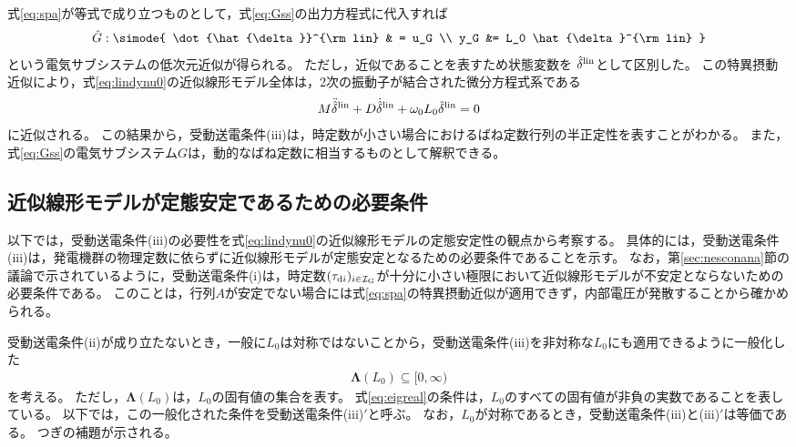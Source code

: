 \documentclass[tombow,dvipdfmx]{corona-a5-1.1}
\begin{document}
式\ref{eq:spa}が等式で成り立つものとして，式\ref{eq:Gss}の出力方程式に代入すれば
\begin{align}\label{eq:Gsssp}
\hat{G}: \simode{
\dot{\hat{\delta}}^{\rm lin} & = u_G \\
y_G &= L_0 \hat{\delta}^{\rm lin}
}
\end{align}
という電気サブシステムの低次元近似が得られる。
ただし，近似であることを表すため状態変数を
$\hat{\delta}^{\rm lin}$として区別した。
この特異摂動近似により，式\ref{eq:lindynu0}の近似線形モデル全体は，2次の振動子が結合された微分方程式系である
\begin{align}\label{eq:spamodel}
M \ddot{\hat{\delta}}^{\rm lin}
+ D \dot{\hat{\delta}}^{\rm lin}
+\omega_0 L_0 \hat{\delta}^{\rm lin}=0
\end{align}
に近似される。
この結果から，受動送電条件(iii)は，時定数が小さい場合におけるばね定数行列の半正定性を表すことがわかる。
また，式\ref{eq:Gss}の電気サブシステム$G$は，動的なばね定数に相当するものとして解釈できる。


\subsection{近似線形モデルが定態安定であるための必要条件\advanced}\label{sec:nesconsta}

以下では，受動送電条件(iii)の必要性を式\ref{eq:lindynu0}の近似線形モデルの定態安定性の観点から考察する。
具体的には，受動送電条件(iii)は，発電機群の物理定数に依らずに近似線形モデルが定態安定となるための必要条件であることを示す。
なお，第\ref{sec:nesconana}節の議論で示されているように，受動送電条件(i)は，時定数$(\tau_{{\rm d}i})_{i \in \mathcal{I}_{\rm G}}$が十分に小さい極限において近似線形モデルが不安定とならないための必要条件である。
このことは，行列$A$が安定でない場合には式\ref{eq:spa}の特異摂動近似が適用できず，内部電圧が発散することから確かめられる。



受動送電条件(ii)が成り立たないとき，一般に$L_0$は対称ではないことから，受動送電条件(iii)を非対称な$L_0$にも適用できるように一般化した
\begin{align}\label{eq:eigreal}
\bm{\Lambda}(L_0)\subseteq [0,\infty)
\end{align}
を考える。
ただし，$\bm{\Lambda}(L_0)$は，$L_0$の固有値の集合を表す。
式\ref{eq:eigreal}の条件は，$L_0$のすべての固有値が非負の実数であることを表している。
以下では，この一般化された条件を受動送電条件(iii)$'$と呼ぶ。
なお，$L_0$が対称であるとき，受動送電条件(iii)と(iii)$'$は等価である。
つぎの補題が示される。
\end{document}
